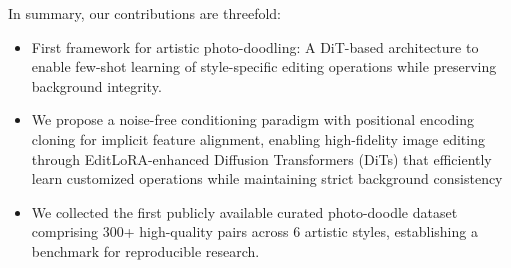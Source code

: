 


In summary, our contributions are threefold:
\begin{itemize}
    \item First framework for artistic photo-doodling: A DiT-based architecture to enable few-shot learning of style-specific editing operations while preserving background integrity.
    \item We propose a noise-free conditioning paradigm with positional encoding cloning for implicit feature alignment, enabling high-fidelity image editing through EditLoRA-enhanced Diffusion Transformers (DiTs) that efficiently learn customized operations while maintaining strict background consistency
  
    \item We collected the first publicly available curated photo-doodle dataset comprising 300+ high-quality pairs across 6 artistic styles, establishing a benchmark for reproducible research.

\end{itemize}


